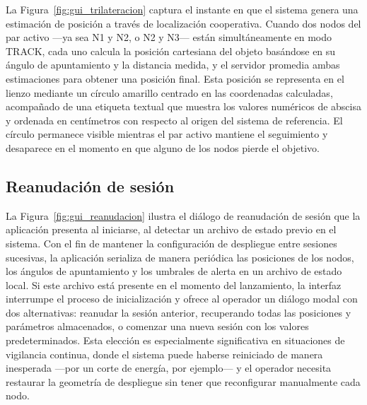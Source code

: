 
La Figura~\ref{fig:gui_trilateracion} captura el instante en que el sistema genera una estimación de posición a través de localización cooperativa. Cuando dos nodos del par activo ---ya sea N1 y N2, o N2 y N3--- están simultáneamente en modo TRACK, cada uno calcula la posición cartesiana del objeto basándose en su ángulo de apuntamiento y la distancia medida, y el servidor promedia ambas estimaciones para obtener una posición final. Esta posición se representa en el lienzo mediante un círculo amarillo centrado en las coordenadas calculadas, acompañado de una etiqueta textual que muestra los valores numéricos de abscisa y ordenada en centímetros con respecto al origen del sistema de referencia. El círculo permanece visible mientras el par activo mantiene el seguimiento y desaparece en el momento en que alguno de los nodos pierde el objetivo.


\subsection{Reanudación de sesión}

La Figura~\ref{fig:gui_reanudacion} ilustra el diálogo de reanudación de sesión que la aplicación presenta al iniciarse, al detectar un archivo de estado previo en el sistema. Con el fin de mantener la configuración de despliegue entre sesiones sucesivas, la aplicación serializa de manera periódica las posiciones de los nodos, los ángulos de apuntamiento y los umbrales de alerta en un archivo de estado local. Si este archivo está presente en el momento del lanzamiento, la interfaz interrumpe el proceso de inicialización y ofrece al operador un diálogo modal con dos alternativas: reanudar la sesión anterior, recuperando todas las posiciones y parámetros almacenados, o comenzar una nueva sesión con los valores predeterminados. Esta elección es especialmente significativa en situaciones de vigilancia continua, donde el sistema puede haberse reiniciado de manera inesperada ---por un corte de energía, por ejemplo--- y el operador necesita restaurar la geometría de despliegue sin tener que reconfigurar manualmente cada nodo.

